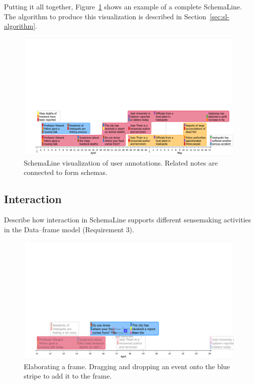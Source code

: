 Putting it all together, Figure~\ref{fig:sl-overview} shows an example of a complete SchemaLine. The algorithm to produce this visualization is described in Section~\ref{sec:sl-algorithm}.

\begin{figure}[!htb]
	\centering
	\includegraphics[width=\linewidth]{teaser}
	\caption{SchemaLine visualization of user annotations. Related notes are connected to form schemas.}
	\label{fig:sl-overview}
\end{figure}

\subsection{Interaction}
Describe how interaction in SchemaLine supports different sensemaking activities in the Data--frame model (Requirement 3).

\begin{figure}[!htb]
	\centering
	\includegraphics[width=.9\linewidth]{add-event-frame}
	\caption{Elaborating a frame. Dragging and dropping an event onto the blue stripe to add it to the frame.}
	\label{fig:drag-drop-note}
\end{figure}

